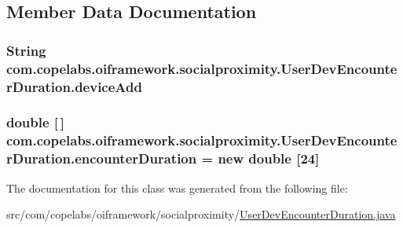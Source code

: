 \subsection{Member Data Documentation}
\hypertarget{classcom_1_1copelabs_1_1oiframework_1_1socialproximity_1_1_user_dev_encounter_duration_ad00928d4a4af4d92feeeb35c9e66a2f4}{}
\subsubsection[{device\+Add}]{\setlength{\rightskip}{0pt plus 5cm}String com.\+copelabs.\+oiframework.\+socialproximity.\+User\+Dev\+Encounter\+Duration.\+device\+Add\hspace{0.3cm}{\ttfamily [private]}}\label{classcom_1_1copelabs_1_1oiframework_1_1socialproximity_1_1_user_dev_encounter_duration_ad00928d4a4af4d92feeeb35c9e66a2f4}
\hypertarget{classcom_1_1copelabs_1_1oiframework_1_1socialproximity_1_1_user_dev_encounter_duration_a1581a2e5cdbdd45dfb462bcab575bb48}{}
\subsubsection[{encounter\+Duration}]{\setlength{\rightskip}{0pt plus 5cm}double \mbox{[}$\,$\mbox{]} com.\+copelabs.\+oiframework.\+socialproximity.\+User\+Dev\+Encounter\+Duration.\+encounter\+Duration = new double \mbox{[}24\mbox{]}\hspace{0.3cm}{\ttfamily [private]}}\label{classcom_1_1copelabs_1_1oiframework_1_1socialproximity_1_1_user_dev_encounter_duration_a1581a2e5cdbdd45dfb462bcab575bb48}


The documentation for this class was generated from the following file\+:\begin{DoxyCompactItemize}
\item 
src/com/copelabs/oiframework/socialproximity/\hyperlink{_user_dev_encounter_duration_8java}{User\+Dev\+Encounter\+Duration.\+java}\end{DoxyCompactItemize}

